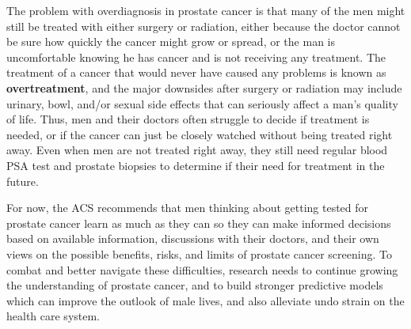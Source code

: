 The problem with overdiagnosis in prostate cancer is that many of the men might still be treated with either surgery or radiation, either because the doctor cannot be sure how quickly the cancer might grow or spread, or the man is uncomfortable knowing he has cancer and is not receiving any treatment. The treatment of a cancer that would never have caused any problems is known as \textbf{overtreatment}, and the major downsides after surgery or radiation may include urinary, bowl, and/or sexual side effects that can seriously affect a man's quality of life. Thus, men and their doctors often struggle to decide if treatment is needed, or if the cancer can just be closely watched without being treated right away. Even when men are not treated right away, they still need regular blood PSA test and prostate biopsies to determine if their need for treatment in the future. \par

For now, the ACS recommends that men thinking about getting tested for prostate cancer learn as much as they can so they can make informed decisions based on available information, discussions with their doctors, and their own views on the possible benefits, risks, and limits of prostate cancer screening. To combat and better navigate these difficulties, research needs to continue growing the understanding of prostate cancer, and to build stronger predictive models which can improve the outlook of male lives, and also alleviate undo strain on the health care system.




